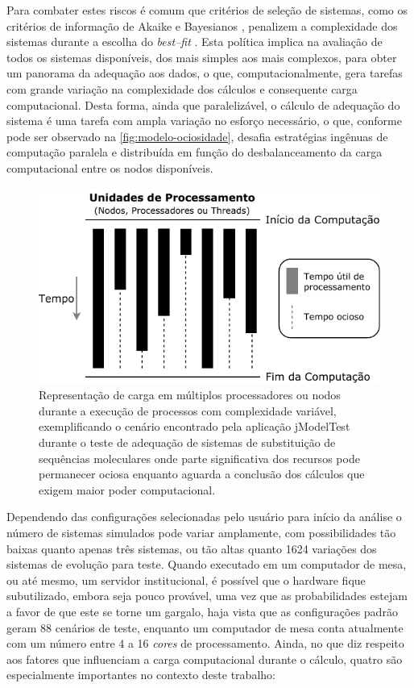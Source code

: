 \documentclass[english,brazilian]{UNISINOSmonografia} %
\newcommand\defaultFigureWidth{0.9}
\begin{document}
Para combater estes riscos é comum que critérios de seleção de sistemas, como os critérios de informação de Akaike \cite{Akaike1974} e Bayesianos \cite{Schwarz1978}, penalizem a complexidade dos sistemas durante a escolha do \textit{best--fit} \cite{yang2014molecular}.
Esta política implica na avaliação de todos os sistemas disponíveis, dos mais simples aos mais complexos, para obter um panorama da adequação aos dados, o que, computacionalmente, gera tarefas com grande variação na complexidade dos cálculos e consequente carga computacional.
Desta forma, ainda que paralelizável, o cálculo de adequação do sistema é uma tarefa com ampla variação no esforço necessário, o que, conforme pode ser observado na \autoref{fig:modelo-ociosidade}, desafia estratégias ingênuas de computação paralela e distribuída em função do desbalanceamento da carga computacional entre os nodos disponíveis.


\begin{figure}[tb]
	\centering%
	\begin{minipage}{\defaultFigureWidth\textwidth}
		\caption{Representação de carga em múltiplos processadores ou nodos durante a execução de processos com complexidade variável, exemplificando o cenário encontrado pela aplicação jModelTest durante o teste de adequação de sistemas de substituição de sequências moleculares onde parte significativa dos recursos pode permanecer ociosa enquanto aguarda a conclusão dos cálculos que exigem maior poder computacional.}
		\label{fig:modelo-ociosidade}
		\centering
		\includegraphics{modelo-ociosidade}
	\end{minipage}
\end{figure}


Dependendo das configurações selecionadas pelo usuário para início da análise o número de sistemas simulados pode variar amplamente, com possibilidades tão baixas quanto apenas três sistemas, ou tão altas quanto 1624 variações dos sistemas de evolução para teste.
Quando executado em um computador de mesa, ou até mesmo, um servidor institucional, é possível que o hardware fique subutilizado, embora seja pouco provável, uma vez que as probabilidades estejam a favor de que este se torne um gargalo, haja vista que as configurações padrão geram 88 cenários de teste, enquanto um computador de mesa conta atualmente com um número entre 4 a 16 \textit{cores} de processamento.
Ainda, no que diz respeito aos fatores que influenciam a carga computacional durante o cálculo, quatro são especialmente importantes no contexto deste trabalho:
\end{document}
